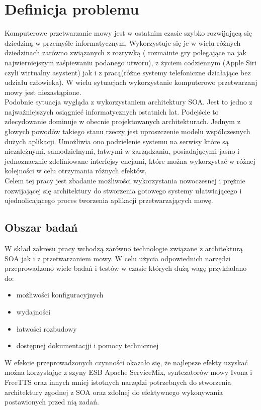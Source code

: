 \section{Definicja problemu } %
Komputerowe przetwarzanie mowy jest w ostatnim czasie szybko rozwijającą się dziedziną w przemyśle informatycznym. Wykorzystuje się je w wielu różnych dziedzinach zarówno związanych z rozrywką ( rozmainte gry polegające na jak najwierniejszym zaśpiewaniu podanego utworu), z życiem codziennym (Apple Siri czyli wirtualny asystent) jak i z pracą(różne systemy telefoniczne działające bez udziału człowieka). W wielu sytuacjach wykorzystanie komputerowo przetwarzanj mowy jest niezastąpione.\\
Podobnie sytuacja wygląda z wykorzystaniem architektury SOA. Jest to jedno z najważniejszych osiągnieć informatycznych ostatnich lat. Podejście to zdecydowanie dominuje w obecnie projektowanych architekturach. Jednym z głowych powodów takiego stanu rzeczy jest uproszczenie modelu współczesnych dużych aplikacji. Umożliwia ono podzielenie systemu na serwisy które są niezależnymi, samodzielnymi, łatwymi w zarządzaniu, posiadającymi jasno i jednoznacznie zdefiniowane interfejsy encjami, które można wykorzystać w różnej kolejności w celu otrzymania różnych efektów. \\
Celem tej pracy jest zbadanie możliwości wykorzystania nowoczesnej i prężnie rozwijającej się architektury do stworzenia gotowego systemy ułatwiającego i ujednolicającego proces tworzenia aplikacji przetwarzających mowę.
 


\subsection{Obszar badań} %
W skład zakresu pracy wchodzą zarówno technologie związane z architekturą SOA jak i z przetwarzaniem mowy. W celu użycia odpowiednich narzędzi przeprowadzono wiele badań i testów w czasie których dużą wagę przykładano do:
\begin{itemize}
 	\item możliwości konfiguracyjnych
	\item wydajności
	\item łatwości rozbudowy
	\item dostępnej dokumentacjji i pomocy technicznej
\end{itemize}
W efekcie przeprowadzonych czynności okazało się, że najlepsze efekty uzyskać można korzystając z szyny ESB  Apache ServiceMix,  syntezatorów mowy Ivona i FreeTTS oraz innych mniej istotnych narzędzi potrzebnych do stworzenia architektury zgodnej z SOA oraz zdolnej do efektywnego wykonywania postawionych przed nią zadań. 


